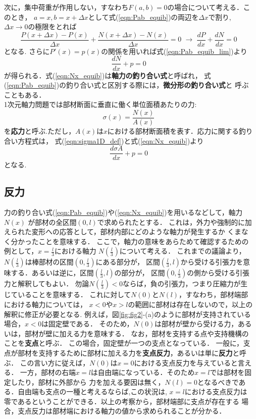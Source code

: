 \documentclass[10pt,a4j]{jbook}
\begin{document}
次に，集中荷重が作用しない，すなわち$F(a,b)=0$の場合について考える．このとき，
$a=x, b=x+\Delta x$として式(\ref{eqn:Pab_equib})の両辺を$\Delta x$で割り, 
$\Delta x\rightarrow 0$の極限をとれば
\begin{equation}
	\frac{P(x+\Delta x)-P(x)}{\Delta x}+\frac{N(x+\Delta x)-N(x)}{\Delta x}=0 \,\,
	\rightarrow
	\, \,
	\frac{dP}{dx}+\frac{dN}{dx}=0
	\label{eqn:Pab_equib_lim}
\end{equation}
となる. さらに$P'(x)=p(x)$の関係を用いれば式(\ref{eqn:Pab_equib_lim})より
\begin{equation}
	\frac{dN}{dx}+p=0
	\label{eqn:Nx_equib}
\end{equation}
が得られる．式(\ref{eqn:Nx_equib})は{\rm \bf 軸力の釣り合い式}と呼ばれ，
式(\ref{eqn:Pab_equib})の釣り合い式と区別する際には，{\rm \bf 微分形の釣り合い式}と
呼ぶこともある．\\

1次元軸力問題では部材断面に垂直に働く単位面積あたりの力:
\begin{equation}
	\sigma(x) = \frac{N(x)}{A(x)}
	\label{eqn:sigma1D_def}
\end{equation}
を{\rm \bf 応力}と呼ぶ.ただし，$A(x)$は$x$における部材断面積を表す．応力に関する釣り合い方程式は，
式(\ref{eqn:sigma1D_def})と式(\ref{eqn:Nx_equib})より
\begin{equation}
	\frac{d\sigma A}{dx}+p=0
	\label{eqn:sigx_equib}
\end{equation}
となる.
\subsection{反力}
力の釣り合い式(\ref{eqn:Pab_equib})や(\ref{eqn:Nx_equib})を用いるなどして，軸力$N(x)$
が部材の全区間$(0,l)$で求められたとする．
これは，外力や強制的に加えられた変形への応答として，部材内部にどのような軸力が発生するか
くまなく分かったことを意味する．
ここで，軸力の意味をあらためて確認するための例として，$x=\frac{l}{3}$における軸力
$N(\frac{l}{3})$について考える．
これまでの議論より，$N(\frac{l}{3})$は棒部材の区間$(0,\frac{l}{3})$にある部分が，
区間$(\frac{l}{3},l)$から受ける引張力を意味する．あるいは逆に，区間$(\frac{l}{3},l)$の部分が，
区間$(0,\frac{l}{3})$の側から受ける引張力と解釈してもよい．
勿論$N(\frac{l}{3})<0$ならば，負の引張力，つまり圧縮力が生じていることを意味する．
これに対して$N(0)$と$N(l)$，すなわち，部材端部における軸力については，
$x<0$や$x>l$の範囲に部材は存在しないので，以上の解釈に修正が必要となる.
例えば，図\ref{fig:fig2}-(a)のように部材が支持されている場合，$x<0$は固定壁である．
そのため，$N(0)$は部材が壁から受ける力，あるいは，部材が壁に加える力を意味する．
なお，部材を支持する点や支持機構のことを{\rm \bf 支点}と呼ぶ．
この場合，固定壁が一つの支点となっている．
一般に，支点が部材を支持するために部材に加える力を{\bf 支点反力}，あるいは単に{\bf 反力}と呼ぶ．
この言い方に従えば，$N(0)$は$x=0$における支点反力を与えていると言える．
一方，部材の右端$x=l$は自由端になっている．そのため$x=l$では部材を固定したり，部材に外部から
力を加える要因は無く，$N(l)=0$となるべきである．自由端も支点の一種と考えるならば,この状況は,
$x=l$における支点反力は零であるということができる．以上の考察から，部材端部に支点が存在する
場合，支点反力は部材端における軸力の値から求められることが分かる．
\end{document}
